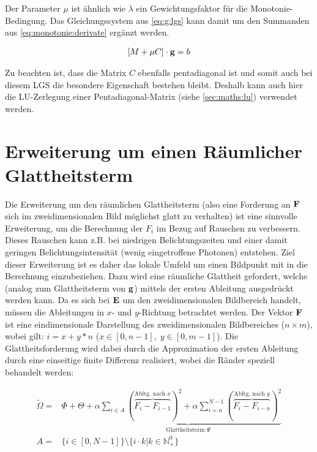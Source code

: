 Der Parameter $\mu$ ist ähnlich wie $\lambda$ ein Gewichtungsfaktor für die Monotonie-Bedingung. Das Gleichungssystem aus \ref{eq:g:lgs} kann damit um den Summanden aus \autoref{eq:monotonie:derivate} ergänzt werden.

\begin{align}
\label{eq:g:monotonie}
[M + \mu C] \cdot \mathbf g = b
\end{align}

Zu beachten ist, dass die Matrix $C$ ebenfalls pentadiagonal ist und somit auch bei diesem \gls{LGS} die besondere Eigenschaft bestehen bleibt. Deshalb kann auch hier die LU-Zerlegung einer \gls{Pentadiagonal-Matrix} (siehe \autoref{sec:maths:lu}) verwendet werden.


\section{Erweiterung um einen Räumlicher Glattheitsterm}
\label{sec:raeumlich}
Die Erweiterung um den räumlichen Glattheitsterm (also eine Forderung an $\mathbf F$ sich im zweidimensionalen Bild möglichst glatt zu verhalten) ist eine sinnvolle Erweiterung, um die Berechnung der $F_i$ im Bezug auf Rauschen zu verbessern. Dieses Rauschen kann z.B. bei niedrigen Belichtungszeiten und einer damit geringen Belichtungsintensität (wenig eingetroffene Photonen) entstehen. Ziel dieser Erweiterung ist es daher das lokale Umfeld um einen Bildpunkt mit in die Berechnung einzubeziehen. Dazu wird eine räumliche Glattheit gefordert, welche (analog zum Glattheitsterm von $\mathbf g$) mittels der ersten Ableitung ausgedrückt werden kann. Da es sich bei $\mathbf E$ um den zweidimensionalen Bildbereich handelt, müssen die Ableitungen in $x$- und $y$-Richtung betrachtet werden. Der Vektor $\mathbf F$ ist eine eindimensionale Darstellung des zweidimensionalen Bildbereiches ($n \times m$), wobei gilt: $i = x+y*n$ ($x \in [0,n-1], \; y \in [0,m-1]$). Die Glattheitsforderung wird dabei durch die Approximation der ersten Ableitung durch eine einseitige finite Differenz realisiert, wobei die Ränder speziell behandelt werden:

\begin{align}
\label{eq:raum:glattheit}
\tilde{\Omega} =& 
    \Phi + \Theta +
    \underbrace{
        \alpha \sum_{i\in A}
            (\overbrace{
                F_i - F_{i-1}
            }^{\mbox{Abltg. nach }x}
        )^2
        +\alpha \sum_{i=n}^{N-1}(
            \overbrace{
                F_i -  F_{i-n}
            }^{\mbox{Abltg. nach }y}
        )^2
    }_{\mbox{Glattheitsterm }\Psi}\\
    \label{eq:raum:x}
    A=& \{ i \in [0,N-1]\} \setminus \{ i \cdot k | k \in \mathbb{N}_+^0 \}
\end{align}

